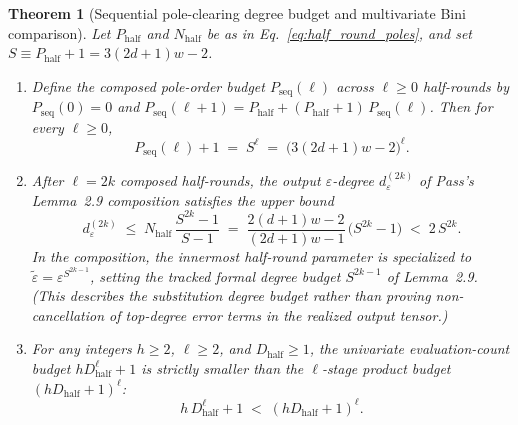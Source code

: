 \documentclass[11pt,a4paper]{article}
\theoremstyle{plain}
\newtheorem{theorem}{Theorem}[section]
\theoremstyle{definition}
\theoremstyle{remark}
\begin{document}
\begin{theorem}[Sequential pole-clearing degree budget and multivariate Bini comparison]
\label{thm:pole_cascade}
Let $P_{\mathrm{half}}$ and $N_{\mathrm{half}}$ be as in Eq.~\eqref{eq:half_round_poles}, and set $S \equiv P_{\mathrm{half}} + 1 = 3(2d + 1)w - 2$.
\begin{enumerate}[label=(\roman*)]
\item Define the composed pole-order budget $P_{\mathrm{seq}}(\ell)$ across $\ell \ge 0$ half-rounds by $P_{\mathrm{seq}}(0) = 0$ and $P_{\mathrm{seq}}(\ell + 1) = P_{\mathrm{half}} + (P_{\mathrm{half}} + 1)\,P_{\mathrm{seq}}(\ell)$. Then for every $\ell \ge 0$,
\begin{equation}
    P_{\mathrm{seq}}(\ell) + 1 \;=\; S^\ell \;=\; \bigl(3(2d + 1)w - 2\bigr)^\ell .
    \label{eq:pole_cascade_exact}
\end{equation}
\item After $\ell = 2k$ composed half-rounds, the output $\varepsilon$-degree $d_\varepsilon^{(2k)}$ of Pass's Lemma~2.9 composition satisfies the upper bound
\begin{equation}
    d_\varepsilon^{(2k)} \;\le\; N_{\mathrm{half}}\,\frac{S^{2k} - 1}{S - 1} \;=\; \frac{2(d + 1)w - 2}{(2d + 1)w - 1}\,\bigl(S^{2k} - 1\bigr) \;<\; 2\,S^{2k} .
    \label{eq:deps_upper}
\end{equation}
In the composition, the innermost half-round parameter is specialized to $\tilde{\varepsilon} = \varepsilon^{S^{2k-1}}$, setting the tracked formal degree budget $S^{2k - 1}$ of Lemma~2.9. (This describes the substitution degree budget rather than proving non-cancellation of top-degree error terms in the realized output tensor.)
\item For any integers $h \ge 2$, $\ell \ge 2$, and $D_{\mathrm{half}} \ge 1$, the univariate evaluation-count budget $h D_{\mathrm{half}}^\ell + 1$ is strictly smaller than the $\ell$-stage product budget $(h D_{\mathrm{half}} + 1)^\ell$:
\begin{equation}
    h\,D_{\mathrm{half}}^\ell + 1 \;<\; (h D_{\mathrm{half}} + 1)^\ell .
    \label{eq:multivar_bini_worse}
\end{equation}
\end{enumerate}
\end{theorem}
\end{document}
